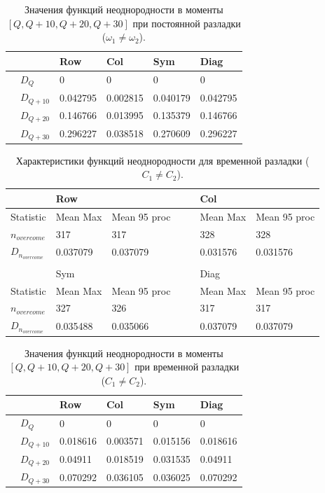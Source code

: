 \documentclass[specialist, substylefile = spbu.rtx,
			   subf, href, 12pt]{disser}
\begin{document}
\begin{table}[!hhh]
	\center
	\caption{Значения функций неоднородности в моменты $ [Q, Q+10, Q+20, Q+30] $ при постоянной разладки ($\omega_1 \neq \omega_2$). }
	\begin{tabular}{ll|llll}
		&              & Row 	  & Col 	& Sym    & Diag  \\
		\hline
		& $D_Q$        & 0	  & 0 	& 0 & 0		\\
		& $D_{Q+10}$   & 0.042795   & 0.002815  & 0.040179 & 0.042795	\\
		& $D_{Q+20}$   & 0.146766   & 0.013995  & 0.135379 & 0.146766	\\
		& $D_{Q+30}$   & 0.296227	  &	0.038518	& 0.270609 & 0.296227	
	\end{tabular}
	\label{tab:PermanentHeterogeneityValues}
\end{table}

\begin{table}[!hhh]
	\center
	\caption{Характеристики функций неоднородности для временной разладки ($ C_1 \neq C_2 $).}
	\begin{tabular}{l|lll|lll}
		 				   & Row		  	  & 			 &&  & 	Col	      & 			      \\
		 				   \hline
		 Statistic        & Mean Max 	  & Mean 95 proc && 	& Mean Max     & Mean 95 proc     \\
		 $n_{overcome}$   & 317   	  & 317      &&     & 328       & 328 		  \\
		$D_{n_{overcome}}$& 0.037079		  &	0.037079	 &&     & 0.031576		  &   0.031576             \\
		&&&&&& \\
		 				   & Sym		  	  & 			 && & 	Diag	      & 			      \\
		 				   \hline
		 Statistic        & Mean Max 	  & Mean 95 proc && 	& Mean Max     & Mean 95 proc     \\
		 $n_{overcome}$   & 327   	  & 326      &&     & 317      & 317		  \\
		 $D_{n_{overcome}}$& 0.035488		  &	0.035066		 &&     & 0.037079		 & 0.037079             \\
	\end{tabular}
	\label{tab:TemporaryHeterogeneityAmplitude}
\end{table}

\begin{table}[!hhh]
	\center
	\caption{Значения функций неоднородности в моменты $ [Q, Q+10, Q+20, Q+30] $ при временной разладки ($ C_1 \neq C_2 $). }
	\begin{tabular}{ll|llll}
		&              & Row 	  & Col 	& Sym    & Diag  \\
		\hline
		& $D_Q$        & 0	  & 0 	& 0 & 0		\\
		& $D_{Q+10}$   & 0.018616   & 0.003571  & 0.015156 & 0.018616	\\
		& $D_{Q+20}$   & 0.04911   & 0.018519  & 0.031535 & 0.04911	\\
		& $D_{Q+30}$   & 0.070292	  &	0.036105	& 0.036025 & 0.070292	
	\end{tabular}
	\label{tab:TemporaryHeterogeneityAmplitudeValues}
\end{table}
\end{document}
